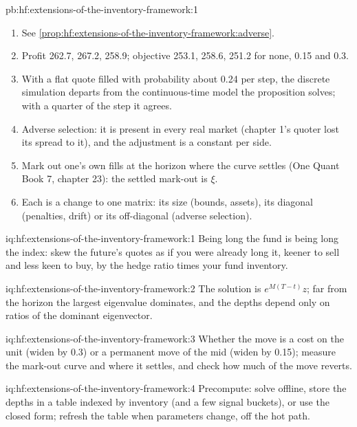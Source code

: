 \begin{solution}{pb:hf:extensions-of-the-inventory-framework:1}
\begin{enumerate}
\item See \cref{prop:hf:extensions-of-the-inventory-framework:adverse}.
\item Profit 262.7, 267.2, 258.9; objective 253.1, 258.6, 251.2 for none, 0.15 and 0.3.
\item With a flat quote filled with probability about 0.24 per step, the discrete simulation departs from the continuous-time model the proposition
solves; with a quarter of the step it agrees.
\item Adverse selection: it is present in every real market (chapter 1's quoter lost its spread to it), and the adjustment is a constant per side.
\item Mark out one's own fills at the horizon where the curve settles (One Quant Book 7, chapter 23): the settled mark-out is $\xi$.
\item Each is a change to one matrix: its size (bounds, assets), its diagonal (penalties, drift) or its off-diagonal (adverse selection).
\end{enumerate}
\end{solution}

\begin{solution}{iq:hf:extensions-of-the-inventory-framework:1}
Being long the fund is being long the index: skew the future's quotes as if you were already long it, keener to sell and less keen to buy, by the
hedge ratio times your fund inventory.
\end{solution}

\begin{solution}{iq:hf:extensions-of-the-inventory-framework:2}
The solution is $e^{M(T-t)}z$; far from the horizon the largest eigenvalue dominates, and the depths depend only on ratios of the dominant eigenvector.
\end{solution}

\begin{solution}{iq:hf:extensions-of-the-inventory-framework:3}
Whether the move is a cost on the unit (widen by 0.3) or a permanent move of the mid (widen by 0.15); measure the mark-out curve and where it settles,
and check how much of the move reverts.
\end{solution}

\begin{solution}{iq:hf:extensions-of-the-inventory-framework:4}
Precompute: solve offline, store the depths in a table indexed by inventory (and a few signal buckets), or use the closed form; refresh the table
when parameters change, off the hot path.
\end{solution}

